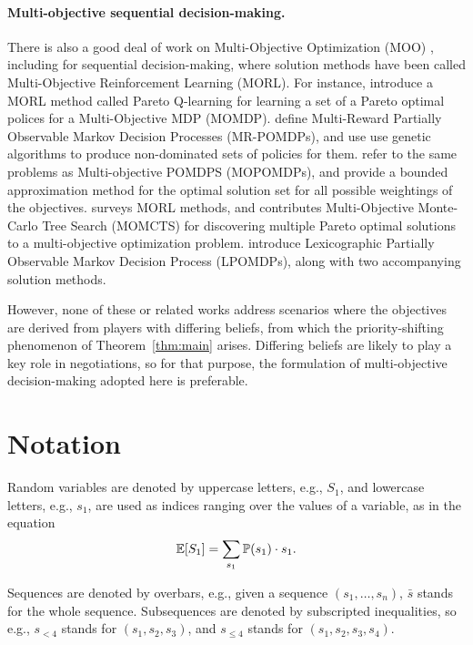 \documentclass{article}
\newcommand{\seq}{\bar}
\newcommand{\thm}[1]{Theorem~\ref{thm:#1}}
\begin{document}
\paragraph{Multi-objective sequential decision-making.} There is also a good deal of work on Multi-Objective Optimization (MOO)  \citep{tzeng2011multiple}, including for sequential decision-making, where solution methods have been called Multi-Objective Reinforcement Learning (MORL).  For instance, \citet{gabor1998multi} introduce a MORL method called Pareto Q-learning for learning a set of a Pareto optimal polices for a Multi-Objective MDP (MOMDP).  \citet{soh2011evolving} define Multi-Reward Partially Observable Markov Decision Processes (MR-POMDPs), and use use genetic algorithms to produce non-dominated sets of policies for them.  \citet{roijers2015point} refer to the same problems as Multi-objective POMDPS (MOPOMDPs), and provide a bounded approximation method for the optimal solution set for all possible weightings of the objectives.  \citet{wang2014multi} surveys MORL methods, and contributes Multi-Objective Monte-Carlo Tree Search (MOMCTS) for discovering multiple Pareto optimal solutions to a multi-objective optimization problem.   \citet{wray2015multi} introduce Lexicographic Partially Observable Markov Decision Process (LPOMDPs), along with two accompanying solution methods.

However, none of these or related works address scenarios where the objectives are derived from players with differing beliefs, from which the priority-shifting phenomenon of \thm{main} arises.  Differing beliefs are likely to play a key role in negotiations, so for that purpose, the formulation of multi-objective decision-making adopted here is preferable.

\section{Notation}

Random variables are denoted by uppercase letters, e.g., $S_1$, and lowercase letters, e.g., $s_1$, are used as indices ranging over the values of a variable, as in the equation
\[
\mathbb{E}[S_1] = \sum_{s_1} \mathbb{P}(s_1)\cdot s_1.
\]

Sequences are denoted by overbars, e.g., given a sequence $(s_1,\ldots,s_n)$, $\seq s$ stands for the whole sequence.   Subsequences are denoted
by subscripted inequalities, so e.g., $s_{<4}$ stands for $(s_1,s_2,s_3)$,
and $s_{\le 4}$ stands for $(s_1,s_2,s_3,s_4)$.
\end{document}
